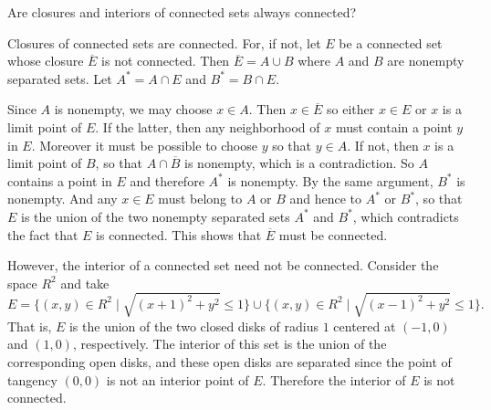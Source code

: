  Are closures and interiors of connected sets always
connected?
\begin{solution}
  Closures of connected sets are connected. For, if not, let $E$ be a
  connected set whose closure $\overline{E}$ is not connected. Then
  $\overline{E} = A\cup B$ where $A$ and $B$ are nonempty separated
  sets. Let $A^* = A\cap E$ and $B^* = B\cap E$.

  Since $A$ is nonempty, we may choose $x\in A$. Then
  $x\in\overline{E}$ so either $x\in E$ or $x$ is a limit point of
  $E$. If the latter, then any neighborhood of $x$ must contain a
  point $y$ in $E$. Moreover it must be possible to choose $y$ so that
  $y\in A$. If not, then $x$ is a limit point of $B$, so that
  $A\cap\overline{B}$ is nonempty, which is a contradiction. So $A$
  contains a point in $E$ and therefore $A^*$ is nonempty. By the same
  argument, $B^*$ is nonempty. And any $x\in E$ must belong to $A$ or
  $B$ and hence to $A^*$ or $B^*$, so that $E$ is the union of the two
  nonempty separated sets $A^*$ and $B^*$, which contradicts the fact
  that $E$ is connected. This shows that $\overline{E}$ must be
  connected.

  However, the interior of a connected set need not be
  connected. Consider the space $R^2$ and take
  \begin{equation*}
    E = \{ (x,y)\in R^2 \mid \sqrt{(x+1)^2 + y^2}\leq1 \}
    \cup
    \{ (x,y)\in R^2 \mid \sqrt{(x-1)^2 + y^2}\leq1 \}.
  \end{equation*}
  That is, $E$ is the union of the two closed disks of radius $1$
  centered at $(-1,0)$ and $(1,0)$, respectively. The interior of this
  set is the union of the corresponding open disks, and these open
  disks are separated since the point of tangency $(0,0)$ is not an
  interior point of $E$. Therefore the interior of $E$ is not
  connected.
\end{solution}

